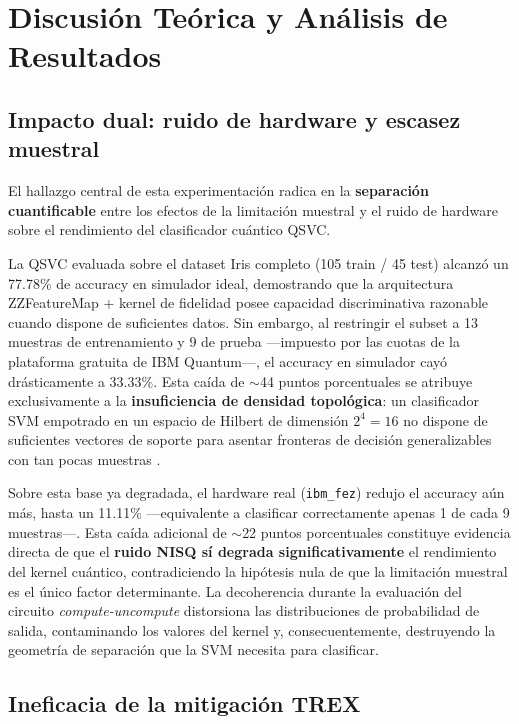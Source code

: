 \section{Discusi\'on Te\'orica y An\'alisis de Resultados}
\label{sec:discusion}

\subsection{Impacto dual: ruido de hardware y escasez muestral}

El hallazgo central de esta experimentaci\'on radica en la \textbf{separaci\'on cuantificable} entre los efectos de la limitaci\'on muestral y el ruido de hardware sobre el rendimiento del clasificador cu\'antico QSVC.

La QSVC evaluada sobre el dataset Iris completo (105 train / 45 test) alcanz\'o un 77.78\% de accuracy en simulador ideal, demostrando que la arquitectura ZZFeatureMap + kernel de fidelidad posee capacidad discriminativa razonable cuando dispone de suficientes datos. Sin embargo, al restringir el subset a 13 muestras de entrenamiento y 9 de prueba ---impuesto por las cuotas de la plataforma gratuita de IBM Quantum---, el accuracy en simulador cay\'o dr\'asticamente a 33.33\%. Esta ca\'ida de $\sim$44 puntos porcentuales se atribuye exclusivamente a la \textbf{insuficiencia de densidad topol\'ogica}: un clasificador SVM empotrado en un espacio de Hilbert de dimensi\'on $2^4 = 16$ no dispone de suficientes vectores de soporte para asentar fronteras de decisi\'on generalizables con tan pocas muestras \citep{schuld2019}.

Sobre esta base ya degradada, el hardware real (\texttt{ibm\_fez}) redujo el accuracy a\'un m\'as, hasta un 11.11\% ---equivalente a clasificar correctamente apenas 1 de cada 9 muestras---. Esta ca\'ida adicional de $\sim$22 puntos porcentuales constituye evidencia directa de que el \textbf{ruido NISQ s\'i degrada significativamente} el rendimiento del kernel cu\'antico, contradiciendo la hip\'otesis nula de que la limitaci\'on muestral es el \'unico factor determinante. La decoherencia durante la evaluaci\'on del circuito \textit{compute-uncompute} distorsiona las distribuciones de probabilidad de salida, contaminando los valores del kernel y, consecuentemente, destruyendo la geometr\'ia de separaci\'on que la SVM necesita para clasificar.

\subsection{Ineficacia de la mitigaci\'on TREX}

